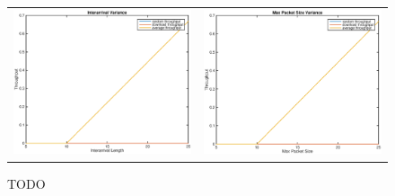 \begin{figure}
\begin{center}
\begin{tabular}{cc}
\includegraphics[scale=0.35]{../../src/fig-simulation_random_download-interarival-1_0_1_0_1_1_25.eps} & \includegraphics[scale=0.35]{../../src/fig-simulation_random_download-maxpackets-1_0_1_0_1_1_25.eps} \\
\end{tabular}
\caption{TODO}
\label{fig:randomstuff}
\end{center}
\end{figure}


